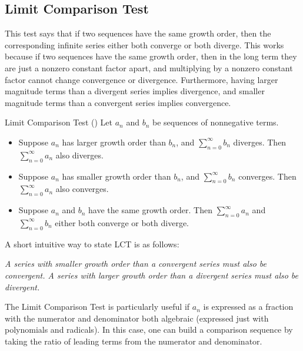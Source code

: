 \subsection{Limit Comparison Test}\label{LCTomato}

This test says that if two sequences have the same growth order, then the corresponding infinite series either both converge or both diverge.  This works because if two sequences have the same growth order, then in the long term they are just a nonzero constant factor apart, and multiplying by a nonzero constant factor cannot change convergence or divergence.  Furthermore, having larger magnitude terms than a divergent series implies divergence, and smaller magnitude terms than a convergent series implies convergence.

\begin{theorem}{Limit Comparison Test ()}
Let $a_n$ and $b_n$ be sequences of nonnegative terms. 
\begin{itemize}
\item Suppose $a_n$ has larger growth order than $b_n$, and $\sum_{n=0}^\infty b_n$ diverges.  Then $\sum_{n=0}^\infty a_n$ also diverges.
\item Suppose $a_n$ has smaller growth order than $b_n$, and $\sum_{n=0}^\infty b_n$ converges.  Then $\sum_{n=0}^\infty a_n$ also converges.
\item Suppose $a_n$ and $b_n$ have the same growth order.  Then $\sum_{n=0}^\infty a_n$ and $\sum_{n=0}^\infty b_n$ either both converge or both diverge.
\end{itemize}
\end{theorem}


A short intuitive way to state LCT is as follows: \begin{center}
\emph{A series with smaller growth order than a convergent series must also be convergent.  A series with larger growth order than a divergent series must also be divergent.}
\end{center}

The Limit Comparison Test is particularly useful if $a_n$ is expressed as a fraction with the numerator and denominator both algebraic (expressed just with polynomials and radicals).  In this case, one can build a comparison sequence by taking the ratio of leading terms from the numerator and denominator.

